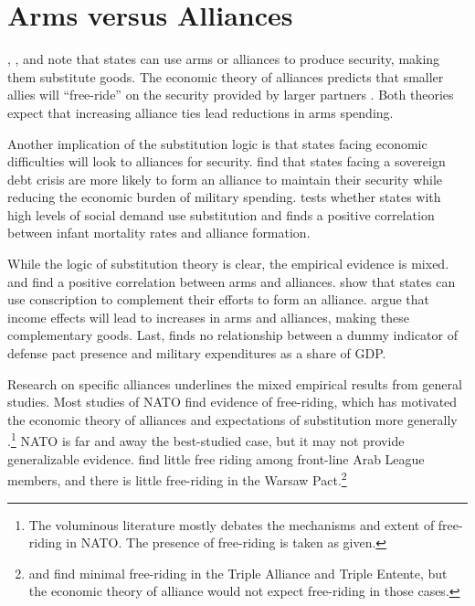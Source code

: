 \documentclass[12pt]{article}
\begin{document}
\section*{Arms versus Alliances}


\citet{Altfield1984}, \citet{Morrow1993}, and \citet{MostStarr1989} note that states can use arms or alliances to produce security, making them substitute goods. The economic theory of alliances predicts that smaller allies will ``free-ride'' on the security provided by larger partners \citep{OlsonZeckhauser1966, SandlerHartley2001, Lake2009}. Both theories expect that increasing alliance ties lead reductions in arms spending. 

Another implication of the substitution logic is that states facing economic difficulties will look to alliances for security. \citet{AllenDigiuseppe2013} find that states facing a sovereign debt crisis are more likely to form an alliance to maintain their security while reducing the economic burden of military spending. \citet{Kimball2010} tests whether states with high levels of social demand use substitution and finds a positive correlation between infant mortality rates and alliance formation. 

While the logic of substitution theory is clear, the empirical evidence is mixed. \citet{Diehl1994} and \citet{QuirozFlores2011} find a positive correlation between arms and alliances. \citet{Horowitzetal2017} show that states can use conscription to complement their efforts to form an alliance. \citet{MorganPalmer2006} argue that income effects will lead to increases in arms and alliances, making these complementary goods. Last, \citet{Goldsmith2003} finds no relationship between a dummy indicator of defense pact presence and military expenditures as a share of GDP. 

Research on specific alliances underlines the mixed empirical results from general studies. Most studies of NATO find evidence of free-riding, which has motivated the economic theory of alliances and expectations of substitution more generally \citep{OlsonZeckhauser1966, SandlerForbes1980, Palmer1990, PluemperNeumayer2015, GeorgeSandler2017}.\footnote{The voluminous literature mostly debates the mechanisms and extent of free-riding in NATO. The presence of free-riding is taken as given.} NATO is far and away the best-studied case, but it may not provide generalizable evidence. \citet{Chenetal1996} find little free riding among front-line Arab League members, and there is little free-riding in the Warsaw Pact.\footnote{\citet{ConybeareSandler1990} and \citet{Goldstein1995}  find minimal free-riding in the Triple Alliance and Triple Entente, but the economic theory of alliance would not expect free-riding in those cases.}  
\end{document}
